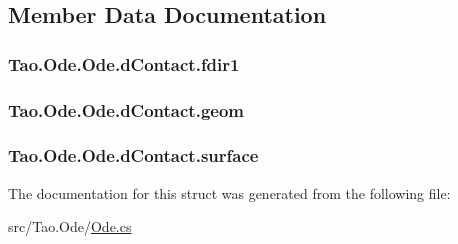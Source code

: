 \subsection{Member Data Documentation}
\hypertarget{struct_tao_1_1_ode_1_1_ode_1_1d_contact_aff7a9dcecef660266b5c04a972e3eac1}{
\subsubsection[{fdir1}]{ {\bf Tao.Ode.Ode.dContact.fdir1}}}
\label{struct_tao_1_1_ode_1_1_ode_1_1d_contact_aff7a9dcecef660266b5c04a972e3eac1}
\hypertarget{struct_tao_1_1_ode_1_1_ode_1_1d_contact_a7081f3f7eb7e987af8010801ecc2e4e9}{
\subsubsection[{geom}]{ {\bf Tao.Ode.Ode.dContact.geom}}}
\label{struct_tao_1_1_ode_1_1_ode_1_1d_contact_a7081f3f7eb7e987af8010801ecc2e4e9}
\hypertarget{struct_tao_1_1_ode_1_1_ode_1_1d_contact_ae6cfbeedf3d62cb5fb337ea1d1cdd9a9}{
\subsubsection[{surface}]{ {\bf Tao.Ode.Ode.dContact.surface}}}
\label{struct_tao_1_1_ode_1_1_ode_1_1d_contact_ae6cfbeedf3d62cb5fb337ea1d1cdd9a9}


The documentation for this struct was generated from the following file:\begin{DoxyCompactItemize}
\item 
src/Tao.Ode/\hyperlink{_ode_8cs}{Ode.cs}\end{DoxyCompactItemize}
